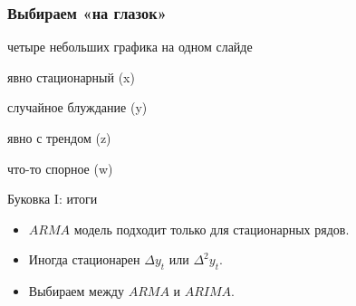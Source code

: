 \begin{frame}
  \frametitle{Выбираем «на глазок»}

  четыре небольших графика на одном слайде

  явно стационарный (x)

  случайное блуждание (y)

  явно с трендом (z)

  что-то спорное (w)
  
\end{frame}



\begin{frame}{Буковка I: итоги}

  \begin{itemize}[<+->]
    \item $ARMA$ модель подходит только для \alert{стационарных} рядов. 
    \item Иногда стационарен $\Delta y_t$ или $\Delta^2 y_t$. 
    \item Выбираем между $ARMA$ и $ARIMA$.
  \end{itemize}
\end{frame}

